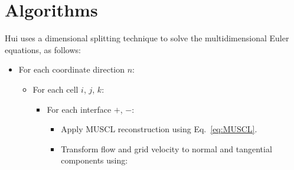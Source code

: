 \section{Algorithms}
Hui\cite{Hui1999} uses a dimensional splitting technique to solve the multidimensional Euler equations, as follows:
\begin{itemize}
  \item For each coordinate direction $n$:
    \begin{itemize}
    \item For each cell $i$, $j$, $k$:
      \begin{itemize}
      \item For each interface $+$, $-$:
        \begin{itemize}
        \item Apply MUSCL reconstruction using Eq.~\ref{eq:MUSCL}.
        \item Transform flow and grid velocity to normal and tangential components using: 

\end{itemize}
\end{itemize}
\end{itemize}
\end{itemize}
